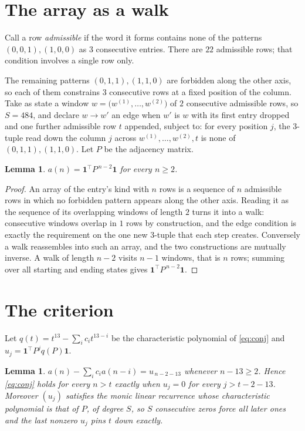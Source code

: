 \documentclass[11pt,a4paper]{article}
\theoremstyle{plain}
\newtheorem{lemma}[theorem]{Lemma}
\theoremstyle{definition}
\begin{document}
\section{The array as a walk}

Call a row \emph{admissible} if the word it forms contains none of the patterns
$(0,0,1), (1,0,0)$ as $3$ consecutive entries. There are $22$ admissible rows; that condition
involves a single row only.

The remaining patterns $(0,1,1), (1,1,0)$ are forbidden along the other axis, so each of them
constrains $3$ consecutive rows at a fixed position of the column. Take as state a
window $w=\bigl(w^{(1)},\dots,w^{(2)}\bigr)$ of $2$ consecutive admissible
rows, so $S=484$, and declare $w\to w'$ an edge when $w'$ is $w$ with its first entry
dropped and one further admissible row $t$ appended, subject to: for every position
$j$, the $3$-tuple read down the column $j$ across $w^{(1)},\dots,w^{(2)},t$
is none of $(0,1,1), (1,1,0)$. Let $P$ be the adjacency matrix.

\begin{lemma}\label{lem:walk}
$a(n)=\mathbf{1}^{\!\top}P^{\,n-2}\mathbf{1}$ for every $n\ge2$.
\end{lemma}

\begin{proof}
An array of the entry's kind with $n$ rows is a sequence of $n$ admissible rows in
which no forbidden pattern appears along the other axis. Reading it as the sequence of its
overlapping windows of length $2$ turns it into a walk: consecutive windows overlap in
$1$ rows by construction, and the edge condition is exactly the requirement on the one
new $3$-tuple that each step creates. Conversely a walk reassembles into such an array,
and the two constructions are mutually inverse. A walk of length $n-2$ visits $n-1$
windows, that is $n$ rows; summing over all starting and ending states gives
$\mathbf{1}^{\!\top}P^{\,n-2}\mathbf{1}$.
\end{proof}

\section{The criterion}

Let $q(t)=t^{13}-\sum_i c_i t^{13-i}$ be the characteristic polynomial of
\eqref{eq:conj} and $u_j=\mathbf{1}^{\!\top}P^{j}q(P)\mathbf{1}$.

\begin{lemma}\label{lem:crit}
$a(n)-\sum_i c_i a(n-i)=u_{\,n-2-13}$ whenever $n-13\ge2$. Hence
\eqref{eq:conj} holds for every $n>t$ exactly when $u_j=0$ for every
$j>t-2-13$. Moreover $(u_j)$ satisfies the monic linear recurrence whose
characteristic polynomial is that of $P$, of degree $S$, so $S$ consecutive zeros force all
later ones and the last nonzero $u_j$ pins $t$ down exactly.
\end{lemma}
\end{document}
